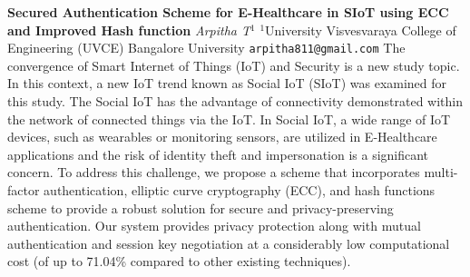 
    \begin{conf-abstract}[]
        {\textbf{Secured Authentication Scheme for E-Healthcare in SIoT using ECC and Improved Hash function }}
        {\textit{Arpitha T$^{1}$}}
        {$^{1}$University Visvesvaraya College of Engineering (UVCE)  Bangalore University}
        {\texttt{arpitha811@gmail.com}}
        { The convergence of Smart Internet of Things (IoT) and Security is a new study  topic. In this context, a new IoT trend known as Social IoT (SIoT) was examined for this study.  The Social IoT has the advantage of connectivity demonstrated within the network of connected  things via the IoT. In Social IoT, a wide range of IoT devices, such as wearables or monitoring  sensors, are utilized in E-Healthcare applications and the risk of identity theft and impersonation  is a significant concern. To address this challenge, we propose a scheme that incorporates multi-factor authentication, elliptic curve cryptography (ECC), and hash functions scheme to provide  a robust solution for secure and privacy-preserving authentication. Our system provides privacy  protection along with mutual authentication and session key negotiation at a considerably low  computational cost (of up to 71.04\% compared to other existing techniques). }
    \end{conf-abstract}
        